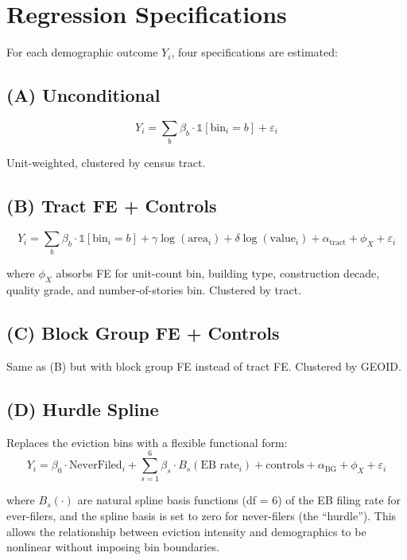 \documentclass[
  11pt,
]{article}
\begin{document}
\section{Regression Specifications}\label{regression-specifications}

For each demographic outcome \(Y_i\), four specifications are estimated:

\subsection{(A) Unconditional}\label{a-unconditional}

\[
Y_i = \sum_{b} \beta_b \cdot \mathbb{1}[\text{bin}_i = b] + \varepsilon_i
\]

Unit-weighted, clustered by census tract.

\subsection{(B) Tract FE + Controls}\label{b-tract-fe-controls}

\[
Y_i = \sum_{b} \beta_b \cdot \mathbb{1}[\text{bin}_i = b] + \gamma \log(\text{area}_i) + \delta \log(\text{value}_i) + \alpha_{\text{tract}} + \phi_X + \varepsilon_i
\]

where \(\phi_X\) absorbs FE for unit-count bin, building type,
construction decade, quality grade, and number-of-stories bin. Clustered
by tract.

\subsection{(C) Block Group FE +
Controls}\label{c-block-group-fe-controls}

Same as (B) but with block group FE instead of tract FE. Clustered by
GEOID.

\subsection{(D) Hurdle Spline}\label{d-hurdle-spline}

Replaces the eviction bins with a flexible functional form: \[
Y_i = \beta_0 \cdot \text{NeverFiled}_i + \sum_{s=1}^{6} \beta_s \cdot B_s(\text{EB rate}_i) + \text{controls} + \alpha_{\text{BG}} + \phi_X + \varepsilon_i
\]

where \(B_s(\cdot)\) are natural spline basis functions (df = 6) of the
EB filing rate for ever-filers, and the spline basis is set to zero for
never-filers (the ``hurdle''). This allows the relationship between
eviction intensity and demographics to be nonlinear without imposing bin
boundaries.
\end{document}
